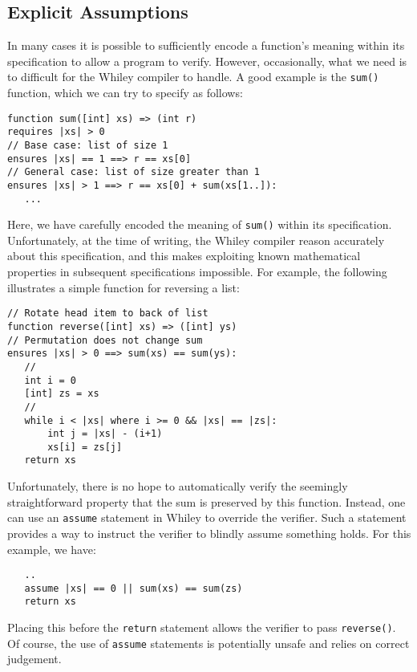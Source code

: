 \subsection{Explicit Assumptions}

In many cases it is possible to sufficiently encode a function's meaning within its specification to allow a program to verify.  However, occasionally, what we need is to difficult for the Whiley compiler to handle.  A good example is the \lstinline{sum()} function, which we can try to specify as follows:

\begin{lstlisting}
function sum([int] xs) => (int r)
requires |xs| > 0
// Base case: list of size 1
ensures |xs| == 1 ==> r == xs[0] 
// General case: list of size greater than 1
ensures |xs| > 1 ==> r == xs[0] + sum(xs[1..]):
   ...
\end{lstlisting}

Here, we have carefully encoded the meaning of \lstinline{sum()} within its specification.  Unfortunately, at the time of writing, the Whiley compiler reason accurately about this specification, and this makes exploiting known mathematical properties in subsequent specifications impossible.  For example, the following illustrates a simple function for reversing a list:

\begin{lstlisting}
// Rotate head item to back of list
function reverse([int] xs) => ([int] ys)
// Permutation does not change sum
ensures |xs| > 0 ==> sum(xs) == sum(ys):
   //
   int i = 0
   [int] zs = xs
   //
   while i < |xs| where i >= 0 && |xs| == |zs|:
       int j = |xs| - (i+1)
       xs[i] = zs[j]
   return xs
\end{lstlisting}

Unfortunately, there is no hope to automatically verify the seemingly straightforward property that the sum is preserved by this function.  Instead, one can use an \lstinline{assume} statement in Whiley to override the verifier.  Such a statement provides a way to instruct the verifier to blindly assume something holds.  For this example, we have:
\begin{lstlisting}
   ..
   assume |xs| == 0 || sum(xs) == sum(zs)
   return xs
\end{lstlisting}

Placing this before the \lstinline{return} statement allows the verifier to pass \lstinline{reverse()}.  Of course, the use of \lstinline{assume} statements is potentially unsafe and relies on correct judgement.  

